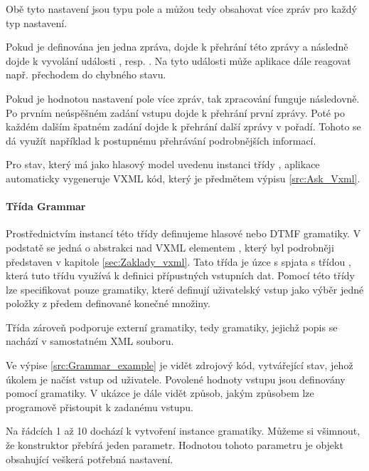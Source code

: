 \documentclass[ing,male,java,dept460]{diploma}						%
\begin{document}
Obě tyto nastavení jsou typu pole a můžou tedy obsahovat více zpráv pro každý typ nastavení.

Pokud je definována jen jedna zpráva, dojde k přehrání této zprávy a následně dojde k vyvolání události , resp. . Na tyto události může aplikace dále reagovat např. přechodem do chybného stavu.

Pokud je hodnotou nastavení pole více zpráv, tak zpracování funguje následovně. Po prvním neúspěšném zadání vstupu dojde k přehrání první zprávy. Poté po každém dalším špatném zadání dojde k přehrání další zprávy v pořadí. Tohoto se dá využít například k postupnému přehrávání podrobnějších informací.

Pro stav, který má jako hlasový model uvedenu instanci třídy , aplikace automaticky vygeneruje VXML kód, který je předmětem výpisu \ref{src:Ask_Vxml}.



\paragraph{Třída Grammar}
\label{sec:Grammar}
Prostřednictvím instancí této třídy definujeme hlasové nebo DTMF gramatiky. V podstatě se jedná o abstrakci nad VXML elementem , který byl podrobněji představen v kapitole \ref{sec:Zaklady_vxml}. Tato třída je úzce s spjata s třídou , která tuto třídu využívá k definici přípustných vstupních dat. Pomocí této třídy lze specifikovat pouze gramatiky, které definují uživatelský vstup jako výběr jedné položky z předem definované konečné množiny.

Třída zároveň podporuje externí gramatiky, tedy gramatiky, jejichž popis se nachází v samostatném XML souboru.

Ve výpise \ref{src:Grammar_example} je vidět zdrojový kód, vytvářející stav, jehož úkolem je načíst vstup od uživatele. Povolené hodnoty vstupu jsou definovány pomocí gramatiky. V ukázce je dále vidět způsob, jakým způsobem lze programově přistoupit k zadanému vstupu.



Na řádcích 1 až 10 dochází k vytvoření instance gramatiky. Můžeme si všimnout, že konstruktor přebírá jeden parametr. Hodnotou tohoto parametru je objekt obsahující veškerá potřebná nastavení.
\end{document}

